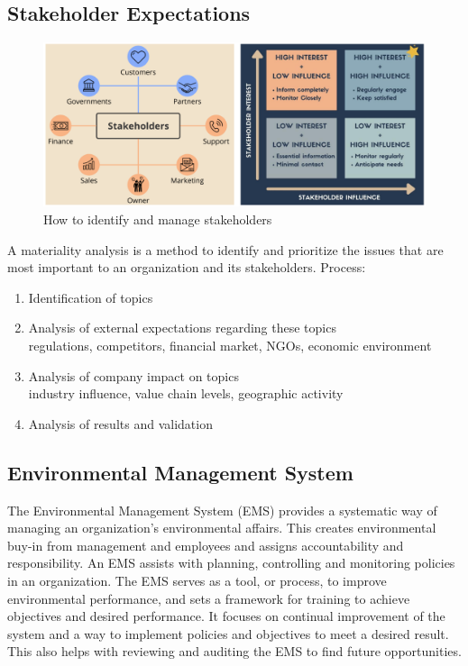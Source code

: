 \documentclass[11pt]{article}
\theoremstyle{definition}
\begin{document}
\subsection{Stakeholder Expectations}
\begin{figure}[H]
	\centering
	\includegraphics[width=0.7\linewidth]{img/stakeholder_expectations}
	\caption{How to identify and manage stakeholders}
	\label{fig:stakeholderexpectations}
\end{figure}
A materiality analysis is a method to identify and prioritize the issues that are
most important to an organization and its stakeholders. Process:
\begin{enumerate}
	\item Identification of topics
	\item Analysis of external expectations regarding these topics\\
	regulations, competitors, financial market, NGOs, economic environment
	\item Analysis of company impact on topics\\
	industry influence, value chain levels, geographic activity
	\item Analysis of results and validation
\end{enumerate}

\subsection{Environmental Management System}
The Environmental Management System (EMS) provides a systematic way of managing an organization's environmental affairs. This creates environmental buy-in from management and employees and assigns accountability and responsibility. An EMS assists with planning, controlling and monitoring policies in an organization. The EMS serves as a tool, or process, to improve environmental performance, and sets a framework for training to achieve objectives and desired performance. It focuses on continual improvement of the system and a way to implement policies and objectives to meet a desired result. This also helps with reviewing and auditing the EMS to find future opportunities.
\end{document}
